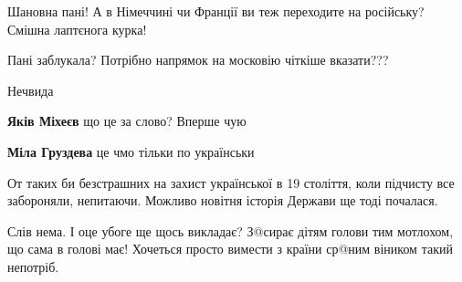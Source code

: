\begin{itemize}
 
Шановна пані! А в Німеччині чи Франції ви теж переходите на російську? Смішна лаптєнога курка!

 
Пані заблукала? Потрібно напрямок на московію чіткіше вказати???

 
Нечвида

\begin{itemize}
 
\textbf{Яків Міхеєв} що це за слово? Вперше чую

 
\textbf{Міла Груздева} це чмо тільки по українськи
\end{itemize}

 
От таких би безстрашних на захист української в 19 століття, коли підчисту все забороняли, непитаючи. Можливо новітня історія Держави ще тоді почалася.

 
Слів нема. І оце убоге ще щось викладає? З@сирає дітям голови тим мотлохом, що сама в голові має! Хочеться просто вимести з країни ср@ним віником такий непотріб.

 


\end{itemize}
